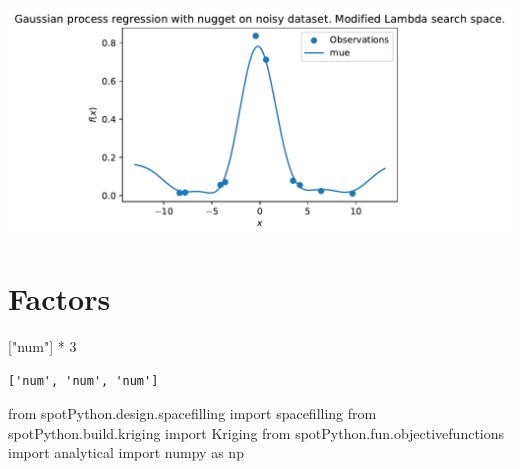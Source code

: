 \documentclass[
  letterpaper,
  DIV=11,
  numbers=noendperiod]{scrreprt}
\newenvironment{Shaded}{\begin{snugshade}}{\end{snugshade}}
\newcommand{\DecValTok}[1]{\textcolor[rgb]{0.68,0.00,0.00}{#1}}
\newcommand{\ImportTok}[1]{\textcolor[rgb]{0.00,0.46,0.62}{#1}}
\newcommand{\NormalTok}[1]{\textcolor[rgb]{0.00,0.23,0.31}{#1}}
\newcommand{\OperatorTok}[1]{\textcolor[rgb]{0.37,0.37,0.37}{#1}}
\newcommand{\StringTok}[1]{\textcolor[rgb]{0.13,0.47,0.30}{#1}}
\begin{document}
\includegraphics{012_num_spot_ei_files/figure-pdf/cell-58-output-1.pdf}

\section{Factors}\label{factors}

\begin{Shaded}
\begin{Highlighting}[]
\NormalTok{[}\StringTok{"num"}\NormalTok{] }\OperatorTok{*} \DecValTok{3}
\end{Highlighting}
\end{Shaded}

\begin{verbatim}
['num', 'num', 'num']
\end{verbatim}

\begin{Shaded}
\begin{Highlighting}[]
\ImportTok{from}\NormalTok{ spotPython.design.spacefilling }\ImportTok{import}\NormalTok{ spacefilling}
\ImportTok{from}\NormalTok{ spotPython.build.kriging }\ImportTok{import}\NormalTok{ Kriging}
\ImportTok{from}\NormalTok{ spotPython.fun.objectivefunctions }\ImportTok{import}\NormalTok{ analytical}
\ImportTok{import}\NormalTok{ numpy }\ImportTok{as}\NormalTok{ np}
\end{Highlighting}
\end{Shaded}
\end{document}
